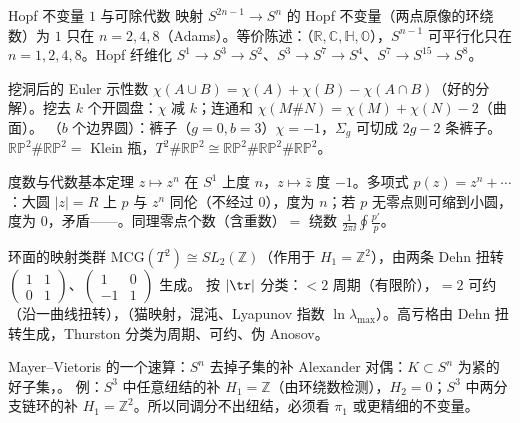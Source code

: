\begin{结论}{Hopf 不变量 $1$ 与可除代数}
映射 $S^{2n-1}\to S^n$ 的 Hopf 不变量（两点原像的环绕数）为 $1$ 只在 $n=2,4,8$（Adams）。等价陈述：（$\mathbb R,\mathbb C,\mathbb H,\mathbb O$），$S^{n-1}$ 可平行化只在 $n=1,2,4,8$。Hopf 纤维化 $S^1\to S^3\to S^2$、$S^3\to S^7\to S^4$、$S^7\to S^{15}\to S^8$。
\end{结论}

\begin{结论}{挖洞后的 Euler 示性数}
$\chi(A\cup B)=\chi(A)+\chi(B)-\chi(A\cap B)$（好的分解）。挖去 $k$ 个开圆盘：$\chi$ 减 $k$；连通和 $\chi(M\#N)=\chi(M)+\chi(N)-2$（曲面）。
（$b$ 个边界圆）：裤子（$g=0,b=3$）$\chi=-1$，$\Sigma_g$ 可切成 $2g-2$ 条裤子。$\mathbb{RP}^2\#\mathbb{RP}^2=$ Klein 瓶，$T^2\#\mathbb{RP}^2\cong\mathbb{RP}^2\#\mathbb{RP}^2\#\mathbb{RP}^2$。
\end{结论}

\begin{结论}{度数与代数基本定理}
$z\mapsto z^n$ 在 $S^1$ 上度 $n$，$z\mapsto\bar z$ 度 $-1$。多项式 $p(z)=z^n+\cdots$：大圆 $|z|=R$ 上 $p$ 与 $z^n$ 同伦（不经过 $0$），度为 $n$；若 $p$ 无零点则可缩到小圆，度为 $0$，矛盾——。同理零点个数（含重数）$=$ 绕数 $\frac1{2\pi\ii}\oint\frac{p'}{p}$。
\end{结论}

\begin{结论}{环面的映射类群}
$\mathrm{MCG}(T^2)\cong SL_2(\mathbb Z)$（作用于 $H_1=\mathbb Z^2$），由两条 Dehn 扭转 $\begin{pmatrix}1&1\\0&1\end{pmatrix}$、$\begin{pmatrix}1&0\\-1&1\end{pmatrix}$ 生成。
按 $|\tr|$ 分类：$<2$ 周期（有限阶），$=2$ 可约（沿一曲线扭转），（猫映射，混沌、Lyapunov 指数 $\ln\lambda_{\max}$）。高亏格由 Dehn 扭转生成，Thurston 分类为周期、可约、伪 Anosov。
\end{结论}

\begin{结论}{Mayer--Vietoris 的一个速算：$S^n$ 去掉子集的补}
Alexander 对偶：$K\subset S^n$ 为紧的好子集，。
例：$S^3$ 中任意纽结的补 $H_1=\mathbb Z$（由环绕数检测），$H_2=0$；$S^3$ 中两分支链环的补 $H_1=\mathbb Z^2$。所以同调分不出纽结，必须看 $\pi_1$ 或更精细的不变量。
\end{结论}

